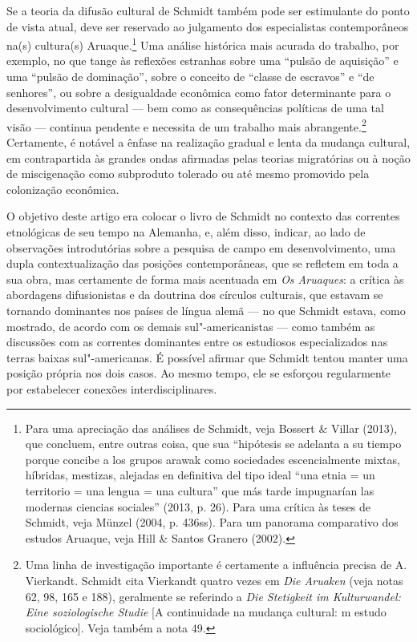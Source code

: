 Se a teoria da difusão cultural de Schmidt também pode ser estimulante
do ponto de vista atual, deve ser reservado ao julgamento dos
especialistas contemporâneos na(s) cultura(s) Aruaque.\footnote{Para uma
  apreciação das análises de Schmidt, veja Bossert \& Villar (2013), que
  concluem, entre outras coisa, que sua ``hipótesis se adelanta a su
  tiempo porque concibe a los grupos arawak como sociedades
  escencialmente mixtas, híbridas, mestizas, alejadas en definitiva del
  tipo ideal ``una etnia = un territorio = una lengua = una cultura'' que
  más tarde impugnarían las modernas ciencias sociales'' (2013, p. 26).
  Para uma crítica às teses de Schmidt, veja Münzel (2004, p. 436ss).
  Para um panorama comparativo dos estudos Aruaque, veja Hill \& Santos
  Granero (2002).} Uma análise histórica mais acurada do trabalho, por
exemplo, no que tange às reflexões estranhas sobre uma ``pulsão de
aquisição'' e uma ``pulsão de dominação'', sobre o conceito de ``classe
de escravos'' e ``de senhores'', ou sobre a desigualdade econômica como
fator determinante para o desenvolvimento cultural --- bem como as
consequências políticas de uma tal visão --- continua pendente e
necessita de um trabalho mais abrangente.\footnote{Uma linha de
  investigação importante é certamente a influência precisa de A.
  Vierkandt. Schmidt cita Vierkandt quatro vezes em \emph{Die Aruaken}
  (veja notas 62, 98, 165 e 188), geralmente se referindo a \emph{Die
  Stetigkeit im Kulturwandel: Eine soziologische Studie} {[}A
  continuidade na mudança cultural: m estudo sociológico{]}. Veja
  também a nota 49.} Certamente, é notável a ênfase na realização
gradual e lenta da mudança cultural, em contrapartida às grandes ondas
afirmadas pelas teorias migratórias ou à noção de miscigenação como
subproduto tolerado ou até mesmo promovido pela colonização econômica.

O objetivo deste artigo era colocar o livro de Schmidt no contexto das
correntes etnológicas de seu tempo na Alemanha, e, além disso, indicar,
ao lado de observações introdutórias sobre a pesquisa de campo em
desenvolvimento, uma dupla contextualização das posições contemporâneas,
que se refletem em toda a sua obra, mas certamente de forma mais
acentuada em \emph{Os Aruaques}: a crítica às abordagens difusionistas e
da doutrina dos círculos culturais, que estavam se tornando dominantes
nos países de língua alemã --- no que Schmidt estava, como mostrado, de
acordo com os demais sul"-americanistas --- como também as discussões com
as correntes dominantes entre os estudiosos especializados nas terras
baixas sul"-americanas. É possível afirmar que Schmidt tentou manter uma
posição própria nos dois casos. Ao mesmo tempo, ele se esforçou
regularmente por estabelecer conexões interdisciplinares.

